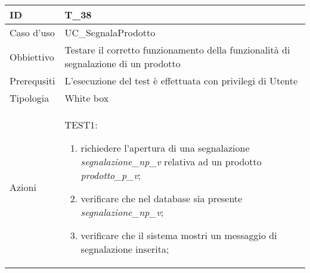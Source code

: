 \begin{table}[hb]
    \centering
    \begin{tabular}{ |p{2cm}|p{10cm}|  }
        \hline
        ID          & T\_38                                                                              \\\hline
        Caso d'uso  & UC\_SegnalaProdotto                                                           \\\hline
        Obbiettivo  & Testare il corretto funzionamento della funzionalità di segnalazione di un prodotto \\\hline
        Prerequsiti & L'esecuzione del test è effettuata con privilegi di Utente                         \\\hline
        Tipologia   & White box                                                                          \\\hline
        Azioni      &
        TEST1:
        \begin{enumerate}[nosep, topsep=0pt]
            \item richiedere l'apertura di una segnalazione \emph{segnalazione\_np\_v} relativa ad un prodotto \emph{prodotto\_p\_v};
            \item verificare che nel database sia presente \emph{segnalazione\_np\_v};
            \item verificare che il sistema mostri un messaggio di segnalazione inserita;
        \end{enumerate}
        \\\hline
    \end{tabular}
\end{table}

